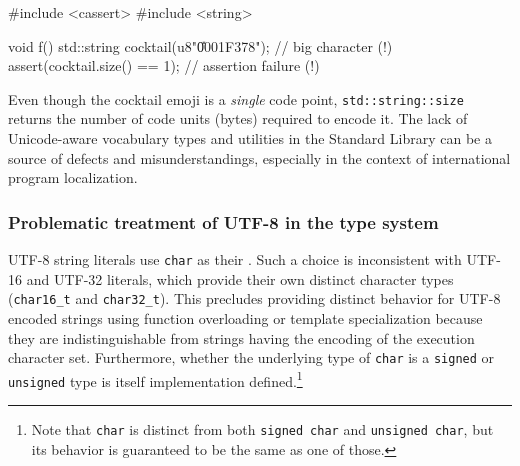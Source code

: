\begin{emcppslisting}[language=C++]
#include <cassert>                                                              
#include <string>                                                               
                                                                                
void f()                                                                        
{                                                                               
    std::string cocktail(u8"\U0001F378"); // big character (!)                  
    assert(cocktail.size() == 1);         // assertion failure (!)              
}
\end{emcppslisting}
    
\noindent Even though the cocktail emoji is a \emph{single} code point,
\lstinline!std::string::size! returns the number of code units (bytes) required to
encode it. The lack of Unicode-aware vocabulary types and utilities in
the Standard Library can be a source of defects and misunderstandings,
especially in the context of international program localization.

\subsubsection[Problematic treatment of UTF-8 in the type system]{Problematic treatment of UTF-8 in the type system}\label{utf-8-quirks}

UTF-8 string literals use \lstinline!char! as their . Such a
choice is inconsistent with UTF-16 and UTF-32 literals, which provide
their own distinct character types (\lstinline!char16_t! and
\lstinline!char32_t!). This precludes providing distinct behavior for UTF-8 encoded strings using function overloading or template specialization because they are indistinguishable from strings having the encoding of the execution character set. Furthermore, whether the underlying
type of \lstinline!char! is a \lstinline!signed! or \lstinline!unsigned! type is
itself implementation defined.{\cprotect\footnote{Note that
\lstinline!char! is distinct from both \lstinline!signed!~\lstinline!char! and
\lstinline!unsigned!~\lstinline!char!, but its behavior is guaranteed to be
  the same as one of those.}}
  
